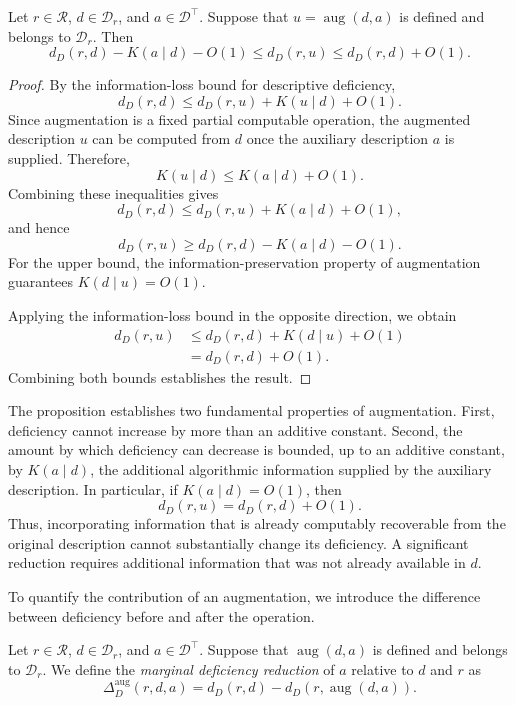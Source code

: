 \begin{proposition}
\label{prop:augmentation_deficiency_bound}
\label{prop:augmentation_deficiency_monotonic}
Let $r\in\mathcal R$, $d\in\mathcal D_r$, and $a\in\mathcal D^\top$. Suppose that $u=\operatorname{aug}(d,a)$ is defined and belongs to $\mathcal D_r$. Then
\[
d_D(r,d)-K(a\mid d)-O(1) \le d_D(r,u) \le d_D(r,d)+O(1).
\]
\end{proposition}
\begin{proof}
By the information-loss bound for descriptive deficiency,
\[
d_D(r,d)
\le
d_D(r,u)+K(u\mid d)+O(1).
\]
Since augmentation is a fixed partial computable operation, the augmented description $u$ can be computed from $d$ once the auxiliary description $a$ is supplied. Therefore,
\[
K(u\mid d)\le K(a\mid d)+O(1).
\]
Combining these inequalities gives
\[
d_D(r,d) \le d_D(r,u)+K(a\mid d)+O(1),
\]
and hence
\[
d_D(r,u) \ge d_D(r,d)-K(a\mid d)-O(1).
\]
For the upper bound, the information-preservation property of augmentation guarantees $K(d\mid u)=O(1)$.

Applying the information-loss bound in the opposite direction, we obtain
\[
\begin{aligned}
d_D(r,u)
& \le d_D(r,d)+K(d\mid u)+O(1)\\
& =d_D(r,d)+O(1).
\end{aligned}
\]
Combining both bounds establishes the result.
\end{proof}

The proposition establishes two fundamental properties of augmentation. First, deficiency cannot increase by more than an additive constant. Second, the amount by which deficiency can decrease is bounded, up to an additive constant, by $K(a\mid d)$, the additional algorithmic information supplied by the auxiliary description. In particular, if $K(a\mid d)=O(1)$, then
\[
d_D(r,u)=d_D(r,d)+O(1).
\]
Thus, incorporating information that is already computably recoverable from the original description cannot substantially change its deficiency. A significant reduction requires additional information that was not already available in $d$.

To quantify the contribution of an augmentation, we introduce the difference between deficiency before and after the operation.

\begin{definition}
\label{def:marginal_deficiency_reduction}
Let $r\in\mathcal R$, $d\in\mathcal D_r$, and $a\in\mathcal D^\top$. Suppose that $\operatorname{aug}(d,a)$ is defined and belongs to $\mathcal D_r$. We define the \emph{marginal deficiency reduction} of $a$ relative to $d$ and $r$ as
\[
\Delta_D^{\mathrm{aug}}(r,d,a) = d_D(r,d) - d_D(r,\operatorname{aug}(d,a)).
\]
\end{definition}

